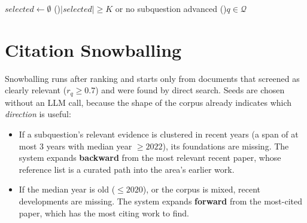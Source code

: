 \documentclass{article}
\begin{document}
\begin{algorithm}[t]
\caption{Round-robin reading allocation}
\label{alg:select}
$\mathit{selected}\leftarrow\emptyset$\;
\Repeat(){$|\mathit{selected}|\ge K$ or no subquestion advanced}{
}
\ForEach(){$q\in\mathcal{Q}$}{
}
\;
\end{algorithm}

\section{Citation Snowballing}
\label{sec:snowball}

Snowballing runs after ranking and starts only from documents that screened
as clearly relevant ($r_q\ge 0.7$) and were found by direct search. Seeds
are chosen without an LLM call, because the shape of the corpus already
indicates which \emph{direction} is useful:

\begin{itemize}[leftmargin=*]
  \item If a subquestion's relevant evidence is clustered in recent years
    (a span of at most 3 years with median year $\ge 2022$), its
    foundations are missing. The system expands \textbf{backward} from the
    most relevant recent paper, whose reference list is a curated path into
    the area's earlier work.
  \item If the median year is old ($\le 2020$), or the corpus is mixed,
    recent developments are missing. The system expands \textbf{forward}
    from the most-cited paper, which has the most citing work to find.
\end{itemize}
\end{document}
